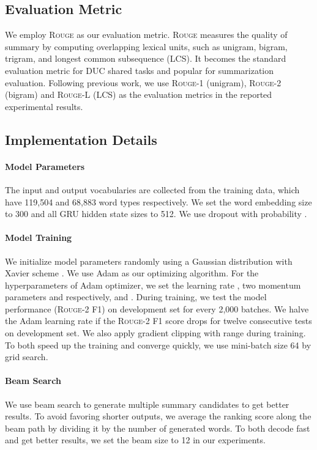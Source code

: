 \documentclass[11pt,a4paper]{article}
\begin{document}
\subsection{Evaluation Metric}
We employ \textsc{Rouge} \citep{lin2004rouge} as our evaluation metric.
\textsc{Rouge} measures the quality of summary by computing overlapping lexical units, such as unigram, bigram, trigram, and longest common subsequence (LCS).
It becomes the standard evaluation metric for DUC shared tasks and popular for summarization evaluation.
Following previous work, we use \textsc{Rouge}-1 (unigram), \textsc{Rouge}-2 (bigram) and \textsc{Rouge}-L (LCS) as the evaluation metrics in the reported experimental results.



\subsection{Implementation Details}

\paragraph{Model Parameters}
The input and output vocabularies are collected from the training data, which have 119,504 and 68,883 word types respectively.
We set the word embedding size to 300 and all GRU hidden state sizes to 512.
We use dropout \citep{srivastava2014dropout} with probability .


\paragraph{Model Training}
We initialize model parameters randomly using a Gaussian distribution with Xavier scheme \citep{glorot2010understanding}.
We use Adam \citep{kingma2014adam} as our optimizing algorithm.
For the hyperparameters of Adam optimizer, we set the learning rate , two momentum parameters  and  respectively, and .
During training, we test the model performance (\textsc{Rouge}-2 F1) on development set for every 2,000 batches.
We halve the Adam learning rate  if the \textsc{Rouge}-2 F1 score drops for twelve consecutive tests on development set.
We also apply gradient clipping \citep{pascanu2013difficulty} with range  during training.
To both speed up the training and converge quickly, we use mini-batch size 64 by grid search.


\paragraph{Beam Search}
We use beam search to generate multiple summary candidates to get better results.
To avoid favoring shorter outputs, we average the ranking score along the beam path by dividing it by the number of generated words.
To both decode fast and get better results, we set the beam size to 12 in our experiments.
\end{document}
